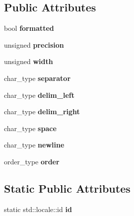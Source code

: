 \subsection*{Public Attributes}
\begin{DoxyCompactItemize}
\item 
\mbox{\label{classglm_1_1io_1_1format__punct_ab28088e6eef03fe4222fa8a5dd95288e}} 
bool {\bfseries formatted}
\item 
\mbox{\label{classglm_1_1io_1_1format__punct_a5a15d396b7c963df9dec5e124236dc02}} 
unsigned {\bfseries precision}
\item 
\mbox{\label{classglm_1_1io_1_1format__punct_a95d32ca2330bbf7c50d3e066b7a851db}} 
unsigned {\bfseries width}
\item 
\mbox{\label{classglm_1_1io_1_1format__punct_ac561eb04fc2a1282ef38ea15f8e640ee}} 
char\+\_\+type {\bfseries separator}
\item 
\mbox{\label{classglm_1_1io_1_1format__punct_ab1beed331269a39b06d17d02cf727d7c}} 
char\+\_\+type {\bfseries delim\+\_\+left}
\item 
\mbox{\label{classglm_1_1io_1_1format__punct_a62fb1280404360463ec5af7144aa0949}} 
char\+\_\+type {\bfseries delim\+\_\+right}
\item 
\mbox{\label{classglm_1_1io_1_1format__punct_adf9a915938727793de1daca07dcdfa4e}} 
char\+\_\+type {\bfseries space}
\item 
\mbox{\label{classglm_1_1io_1_1format__punct_a8ddf8abdb0ebbdbb7eca08d7a777956e}} 
char\+\_\+type {\bfseries newline}
\item 
\mbox{\label{classglm_1_1io_1_1format__punct_a9de1f3b7120a036ec0ab394d2036d0aa}} 
order\+\_\+type {\bfseries order}
\end{DoxyCompactItemize}
\subsection*{Static Public Attributes}
\begin{DoxyCompactItemize}
\item 
\mbox{\label{classglm_1_1io_1_1format__punct_a763f60aeaecec9290917ed1d83b79838}} 
static std\+::locale\+::id {\bfseries id}
\end{DoxyCompactItemize}
